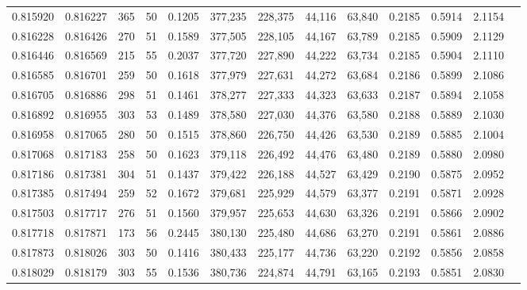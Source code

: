 \begin{tabular}{rrrrrrrrrrrrr}
0.815920 & 0.816227 &   365 &  50 &                                     0.1205 & 377,235 & 228,375 &  44,116 &  63,840 & 0.2185 & 0.5914 & 2.1154 \\
0.816228 & 0.816426 &   270 &  51 &                                     0.1589 & 377,505 & 228,105 &  44,167 &  63,789 & 0.2185 & 0.5909 & 2.1129 \\
0.816446 & 0.816569 &   215 &  55 &                                     0.2037 & 377,720 & 227,890 &  44,222 &  63,734 & 0.2185 & 0.5904 & 2.1110 \\
0.816585 & 0.816701 &   259 &  50 &                                     0.1618 & 377,979 & 227,631 &  44,272 &  63,684 & 0.2186 & 0.5899 & 2.1086 \\
0.816705 & 0.816886 &   298 &  51 &                                     0.1461 & 378,277 & 227,333 &  44,323 &  63,633 & 0.2187 & 0.5894 & 2.1058 \\
0.816892 & 0.816955 &   303 &  53 &                                     0.1489 & 378,580 & 227,030 &  44,376 &  63,580 & 0.2188 & 0.5889 & 2.1030 \\
0.816958 & 0.817065 &   280 &  50 &                                     0.1515 & 378,860 & 226,750 &  44,426 &  63,530 & 0.2189 & 0.5885 & 2.1004 \\
0.817068 & 0.817183 &   258 &  50 &                                     0.1623 & 379,118 & 226,492 &  44,476 &  63,480 & 0.2189 & 0.5880 & 2.0980 \\
0.817186 & 0.817381 &   304 &  51 &                                     0.1437 & 379,422 & 226,188 &  44,527 &  63,429 & 0.2190 & 0.5875 & 2.0952 \\
0.817385 & 0.817494 &   259 &  52 &                                     0.1672 & 379,681 & 225,929 &  44,579 &  63,377 & 0.2191 & 0.5871 & 2.0928 \\
0.817503 & 0.817717 &   276 &  51 &                                     0.1560 & 379,957 & 225,653 &  44,630 &  63,326 & 0.2191 & 0.5866 & 2.0902 \\
0.817718 & 0.817871 &   173 &  56 &                                     0.2445 & 380,130 & 225,480 &  44,686 &  63,270 & 0.2191 & 0.5861 & 2.0886 \\
0.817873 & 0.818026 &   303 &  50 &                                     0.1416 & 380,433 & 225,177 &  44,736 &  63,220 & 0.2192 & 0.5856 & 2.0858 \\
0.818029 & 0.818179 &   303 &  55 &                                     0.1536 & 380,736 & 224,874 &  44,791 &  63,165 & 0.2193 & 0.5851 & 2.0830 \\

\end{tabular}
